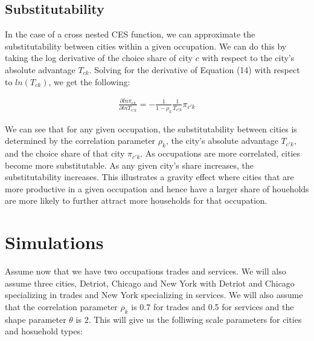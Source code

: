 \documentclass[10pt]{article}
\begin{document}

\subsection{Substitutability}

In the case of a cross nested CES function, we can approximate the substitutability between cities within a given occupation. We can do this by taking the log derivative of the choice share of city $c$ with respect to the city's absolute advantage $T_{ck}$. Solving for the derivative of Equation (14) with respect to $ln (T_{ck})$, we get the following:

\begin{align}
    \frac{\partial ln \pi_{ck}}{\partial ln T_{c'k}} = - \frac{1}{1 - \rho_k} \frac{1}{T_{c'k}} \pi_{c'k}
\end{align}

We can see that for any given occupation, the substitutability between cities is determined by the correlation parameter $\rho_k$, the city's absolute advantage $T_{c'k}$, and the choice share of that city $\pi_{c'k}$. As occupations are more correlated, cities become more substitutable. As any given city's share increases, the substitutability increases. This illustrates a gravity effect where cities that are more productive in a given occupation and hence have a larger share of houeholds are more likely to further attract more households for that occupation.

\section{Simulations}

Assume now that we have two occupations trades and services. We will also assume three cities, Detriot, Chicago and New York with Detriot and Chicago specializing in trades and New York specializing in services. We will also assume that the correlation parameter $\rho_k$ is 0.7 for trades and 0.5 for services and the shape parameter $\theta$ is 2. This will give us the folliwing scale parameters for cities and hosuehold types:

\vspace{2em}
\end{document}
